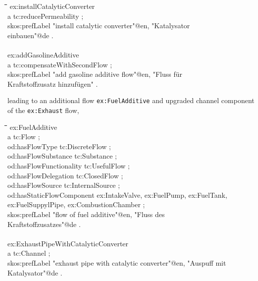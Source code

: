 \documentclass[a4paper,11pt]{article}
\newenvironment{code}{\tt \begin{tabbing}
\hskip12pt\=\hskip12pt\=\hskip12pt\=\hskip12pt\=\hskip5cm\=\hskip5cm\=\kill}
{\end{tabbing}}
\begin{document}
\begin{itemize}
    \begin{code}
    ex:installCatalyticConverter \\
    \> a tc:reducePermeability ; \\
    \> skos:prefLabel "install catalytic converter"@en, "Katalysator  \\
    \> einbauen"@de .  \\
    \\
    ex:addGasolineAdditive \\
    \> a tc:compensateWithSecondFlow ; \\
    \> skos:prefLabel "add gasoline additive flow"@en, "Fluss für  \\
    \> Kraftstoffzusatz hinzufügen" . \\
    \end{code}
    
    leading to an additional flow \texttt{ex:FuelAdditive} and upgraded channel
    component of the \texttt{ex:Exhaust} flow,
    \begin{code}
    ex:FuelAdditive \\
    \> a tc:Flow ; \\
    \> od:hasFlowType tc:DiscreteFlow ; \\
    \> od:hasFlowSubstance tc:Substance ; \\
    \> od:hasFlowFunctionality tc:UsefulFlow ; \\
    \> od:hasFlowDelegation tc:ClosedFlow ; \\
    \> od:hasFlowSource tc:InternalSource ; \\
    \> od:hasStaticFlowComponent ex:IntakeValve, ex:FuelPump, ex:FuelTank,  \\
    \> ex:FuelSuppylPipe, ex:CombustionChamber ; \\
    \> skos:prefLabel "flow of fuel additive"@en, "Fluss des  \\
    \> Kraftstoffzusatzes"@de . \\
    \\
    ex:ExhaustPipeWithCatalyticConverter \\
    \> a tc:Channel ; \\
    \> skos:prefLabel "exhaust pipe with catalytic converter"@en, "Auspuff mit  \\
    \> Katalysator"@de . \\
    \end{code}
    

\end{itemize}
\end{document}
